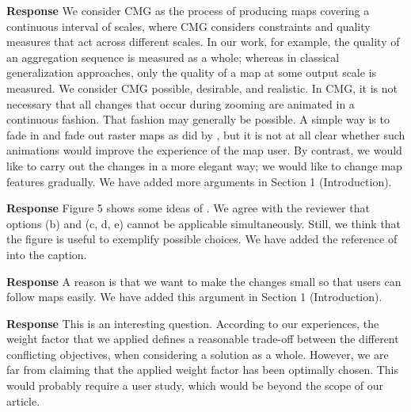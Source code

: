 \documentclass[a4paper,twoside,11pt]{reviewresponse}
\begin{document}

\textbf{Response} 
We consider CMG as the process of producing maps 
covering a continuous interval of scales,
where CMG considers constraints and quality measures 
that act across different scales. 
In our work, for example, the quality of an aggregation sequence 
is measured as a whole; 
whereas in classical generalization approaches, 
only the quality of a map at some output scale is measured.
We consider CMG possible, desirable, and realistic.
In CMG, it is not necessary that 
all changes that occur during zooming are animated in a continuous fashion. 
That fashion may generally be possible. 
A simple way is to fade in and fade out raster maps
as did by \textcite{Pantazis2009b}, 
but it is not at all clear 
whether such animations would improve the experience of the map user.
By contrast, we would like to carry out the changes in a more elegant way;
we would like to change map features gradually.
We have added more arguments in Section 1 (Introduction).



\textbf{Response} Figure 5 shows some ideas of \textcite{Cheng2006}.
We agree with the reviewer that
options (b) and (c, d, e) cannot be applicable simultaneously.
Still, we think that the figure is useful to exemplify possible choices.
We have added the reference of \textcite{Cheng2006} into the caption.



\textbf{Response}
A reason is that we want to make the changes small 
so that users can follow maps easily.
We have added this argument in Section 1 (Introduction).


\textbf{Response} 
This is an interesting question.
According to our experiences, 
the weight factor that we applied defines a reasonable trade-off 
between the different conflicting objectives, 
when considering a solution as a whole. 
However, we are far from claiming that 
the applied weight factor has been optimally chosen. 
This would probably require a user study, 
which would be beyond the scope of our article.
\end{document}
